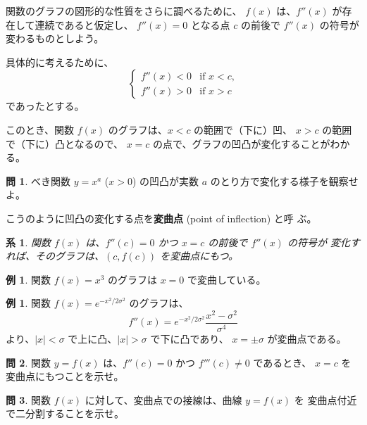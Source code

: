 \documentclass[a4paper]{jsarticle}
\newtheorem{Corollary}[Theorem]{系}
\theoremstyle{definition}
\newtheorem{Example}[Theorem]{例}
\newtheorem{Exercise}{問}%
\theoremstyle{remark}
\begin{document}
関数のグラフの図形的な性質をさらに調べるために、
$f(x)$ は、$f''(x)$ が存在して連続であると仮定し、
$f''(x) = 0$ となる点 $c$ の前後で $f''(x)$ の符号が変わるものとしよう。

具体的に考えるために、
\[
\begin{cases}
f''(x) < 0 &\text{if $x < c$,}\\
f''(x) > 0 &\text{if $x > c$}
\end{cases}
\]
であったとする。

このとき、関数 $f(x)$ のグラフは、$x < c$ の範囲で（下に）凹、
$x >c$ の範囲で（下に）凸となるので、
$x=c$ の点で、グラフの凹凸が変化することがわかる。

\begin{Exercise}
べき関数 $y = x^a$ ($x>0$) の凹凸が実数 $a$ のとり方で変化する様子を観察せよ。
\end{Exercise}

こうのように凹凸の変化する点を{\bf 変曲点} (point of inflection) と呼
ぶ。

\begin{figure}[htbp]
\centering

\caption{}
\end{figure}

\begin{Corollary}
関数 $f(x)$ は、$f''(c) = 0$ かつ $x=c$ の前後で $f''(x)$ の符号が
変化すれば、そのグラフは、$(c,f(c))$ を変曲点にもつ。
\end{Corollary}

\begin{Example}
関数 $f(x) = x^3$ のグラフは $x=0$ で変曲している。
\end{Example}

\begin{Example}
関数 $f(x) = e^{-x^2/2\sigma^2}$ のグラフは、
\[
f''(x) = e^{-x^2/2\sigma^2} \frac{x^2 - \sigma^2}{\sigma^4}
\]
より、$|x| < \sigma$ で上に凸、$|x| > \sigma$ で下に凸であり、
$x = \pm \sigma$ が変曲点である。
\end{Example}

\begin{Exercise}
関数 $y = f(x)$ は、$f''(c) = 0$ かつ $f'''(c) \not= 0$ であるとき、
$x=c$ を変曲点にもつことを示せ。
\end{Exercise}


\begin{Exercise}
関数 $f(x)$ に対して、変曲点での接線は、曲線 $y= f(x)$ を
変曲点付近で二分割することを示せ。  
\end{Exercise}
\end{document}
